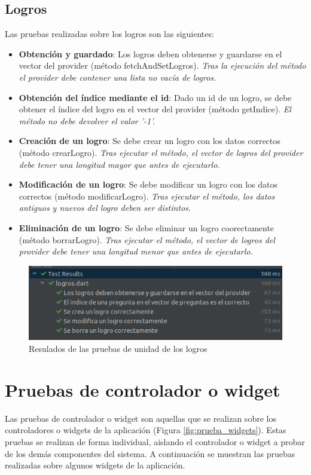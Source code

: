 \subsection{Logros}
\label{subsec:pruebas-unidad-logros}
Las pruebas realizadas sobre los logros son las siguientes:
\begin{itemize}
    \item \textbf{Obtención y guardado}: Los logros deben obtenerse y guardarse en el vector del provider (método fetchAndSetLogros). \textit{Tras la ejecución del método el provider debe contener una lista no vacía de logros.}
    \item \textbf{Obtención del índice mediante el id}: Dado un id de un logro, se debe obtener el índice del logro en el vector del provider (método getIndice). \textit{El método no debe devolver el valor '-1'.}
    \item \textbf{Creación de un logro}: Se debe crear un logro con los datos correctos (método crearLogro). \textit{Tras ejecutar el método, el vector de logros del provider debe tener una longitud mayor que antes de ejecutarlo.}
    \item \textbf{Modificación de un logro}: Se debe modificar un logro con los datos correctos (método modificarLogro). \textit{Tras ejecutar el método, los datos antiguos y nuevos del logro deben ser distintos.}
    \item \textbf{Eliminación de un logro}: Se debe eliminar un logro coorectamente (método borrarLogro). \textit{Tras ejecutar el método, el vector de logros del provider debe tener una longitud menor que antes de ejecutarlo.}
\end{itemize}

\begin{figure}[H]
    \centering
    \includegraphics[width=\textwidth]{imagenes/c8/pruebalogros.png}
    \caption{Resulados de las pruebas de unidad de los logros}
    \label{fig:pruebas_unidad_logros}
\end{figure}


\section{Pruebas de controlador o widget}
\label{sec:pruebas-controlador}
Las pruebas de controlador o widget son aquellas que se realizan sobre los controladores o widgets de la aplicación (Figura \ref{fig:prueba_widgets}). Estas pruebas se realizan de forma individual, aislando el controlador o widget a probar de los demás componentes del sistema.
A continuación se muestran las pruebas realizadas sobre algunos widgets de la aplicación.

